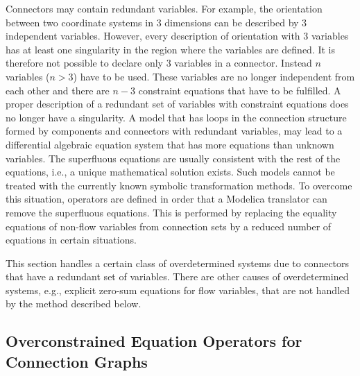 \begin{nonnormative}
Connectors may contain redundant variables. For example, the
orientation between two coordinate systems in $3$ dimensions can be
described by $3$ independent variables. However, every description of
orientation with $3$ variables has at least one singularity in the region
where the variables are defined. It is therefore not possible to declare
only $3$ variables in a connector. Instead $n$ variables ($n > 3$) have to be used. These variables are no longer independent from each
other and there are $n - 3$ constraint equations that have to be fulfilled.
A proper description of a redundant set of variables with constraint
equations does no longer have a singularity. A model that has loops in
the connection structure formed by components and connectors with
redundant variables, may lead to a differential algebraic equation
system that has more equations than unknown variables. The superfluous
equations are usually consistent with the rest of the equations, i.e., a
unique mathematical solution exists. Such models cannot be treated with
the currently known symbolic transformation methods. To overcome this
situation, operators are defined in order that a Modelica translator can
remove the superfluous equations. This is performed by replacing the
equality equations of non-flow variables from connection sets by a
reduced number of equations in certain situations.

This section handles a certain class of overdetermined systems due
to connectors that have a redundant set of variables. There are other
causes of overdetermined systems, e.g., explicit zero-sum equations for
flow variables, that are not handled by the method described below.
\end{nonnormative}

\subsection{Overconstrained Equation Operators for Connection Graphs}

